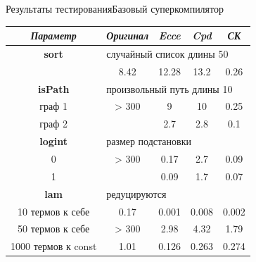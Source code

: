 \documentclass[xcolor=table]{beamer}
\begin{document}
\begin{frame}{Результаты тестирования}{Базовый суперкомпилятор}

\begin{table}
\center
\begin{tabular}{|c|c|c|c|c|}
\hline
{\it Параметр} & {\it Оригинал} & {\it Ecce }  & {\it Cpd} & {\it СК} \\ \hline

\rowcolor{black!10}
{\bf sort} & \multicolumn{4}{|l|}{случайный список длины 50 } \\ \hline
         & 8.42     & 12.28 & 13.2 & 0.26    \\ \hline

\rowcolor{black!10}
{\bf isPath} & \multicolumn{4}{|l|}{произвольный путь длины 10} \\ \hline
граф 1 & > 300    & 9     & 10   & 0.25   \\ 
граф 2 &          & 2.7   & 2.8  & 0.1    \\
\hline

\rowcolor{black!10}
{\bf logint} & \multicolumn{4}{|l|}{размер подстановки} \\ \hline
0 & > 300    & 0.17  & 2.7  & 0.09    \\
1 &          & 0.09  & 1.7  & 0.07    \\
\hline

\rowcolor{black!10}
{\bf lam} & \multicolumn{4}{|l|}{редуцируются} \\ \hline
10 термов к себе    & 0.17     & 0.001 & 0.008 & 0.002  \\
50 термов к себе    & > 300    & 2.98  & 4.32  & 1.79   \\
1000 термов к const & 1.01     & 0.126 & 0.263 & 0.274  \\
\hline
\end{tabular}
\end{table}

\end{frame}
\end{document}
